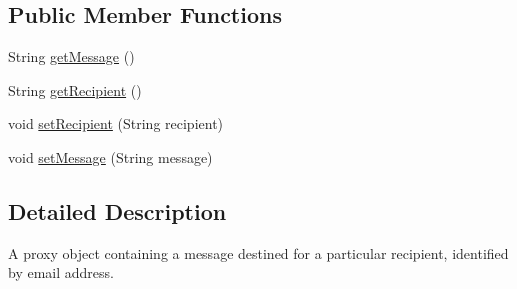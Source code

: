\subsection*{Public Member Functions}
\begin{DoxyCompactItemize}
\item 
String \hyperlink{interfacecsc440_1_1nuf_1_1shared_1_1_message_proxy_a37848b521a3a3819838801e78b9c1fcf}{get\-Message} ()
\item 
String \hyperlink{interfacecsc440_1_1nuf_1_1shared_1_1_message_proxy_a4d2f3521869363d181d0f0395bab98bf}{get\-Recipient} ()
\item 
void \hyperlink{interfacecsc440_1_1nuf_1_1shared_1_1_message_proxy_ae5db6a14c1cd21b25d90e77d56a85ddd}{set\-Recipient} (String recipient)
\item 
void \hyperlink{interfacecsc440_1_1nuf_1_1shared_1_1_message_proxy_a05843b2b7eb495a2b217f37a0f25db3b}{set\-Message} (String message)
\end{DoxyCompactItemize}


\subsection{Detailed Description}
A proxy object containing a message destined for a particular recipient, identified by email address. 

